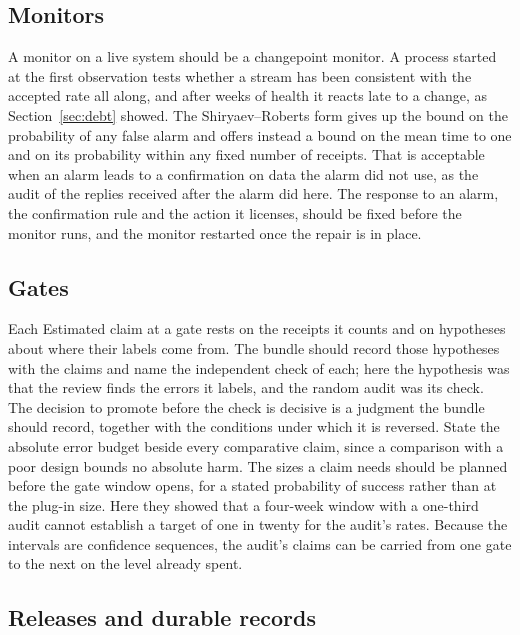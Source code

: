 \documentclass[11pt]{article}
\theoremstyle{definition}
\theoremstyle{plain}
\begin{document}
\subsection{Monitors}

A monitor on a live system should be a changepoint monitor. A process started at the first
observation tests whether a stream has been consistent with the accepted rate all along, and after
weeks of health it reacts late to a change, as Section~\ref{sec:debt} showed. The
Shiryaev--Roberts form gives up the bound on the probability of any false alarm and offers instead a
bound on the mean time to one and on its probability within any fixed number of receipts. That is
acceptable when an alarm leads to a confirmation on data the alarm did not use, as the audit of the
replies received after the alarm did here. The response to an alarm, the confirmation rule and the
action it licenses, should be fixed before the monitor runs, and the monitor restarted once the
repair is in place.

\subsection{Gates}

Each Estimated claim at a gate rests on the receipts it counts and on hypotheses about where their
labels come from. The bundle should record those hypotheses with the claims and name the
independent check of each; here the hypothesis was that the review finds the errors it labels, and
the random audit was its check. The decision to promote before the check is decisive is a judgment
the bundle should record, together with the conditions under which it is reversed. State the
absolute error budget beside every comparative claim, since a comparison with a poor design bounds
no absolute harm. The sizes a claim
needs should be planned before the gate window opens, for a stated probability of success rather
than at the plug-in size. Here they showed that a four-week window with a one-third audit cannot
establish a target of one in twenty for the audit's rates. Because the intervals are confidence
sequences, the audit's claims can be carried from one gate to the next on the level already spent.

\subsection{Releases and durable records}
\end{document}
